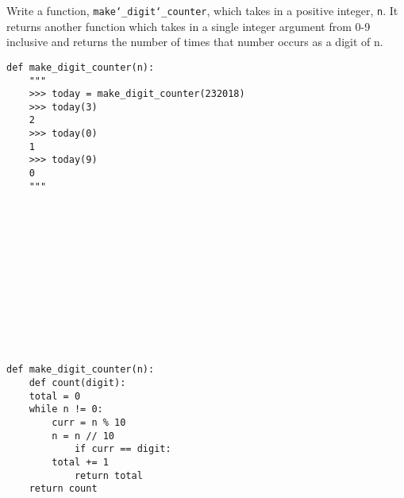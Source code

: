 \begin{blocksection}
\question Write a function, \texttt{make\char`_digit\char`_counter}, which takes in a positive integer, \texttt{n}. It returns another function which takes in a single integer argument from 0-9 inclusive and returns the number of times that number occurs as a digit of n.


\begin{lstlisting}
def make_digit_counter(n):
    """
    >>> today = make_digit_counter(232018)
    >>> today(3)
    2
    >>> today(0)
    1
    >>> today(9)
    0
    """


	
	
	
	




	


\end{lstlisting}

\begin{solution}
\begin{lstlisting}
def make_digit_counter(n):
    def count(digit):
	total = 0
	while n != 0:
	    curr = n % 10
	    n = n // 10
            if curr == digit:
		total += 1
	        return total
	return count


\end{lstlisting}
\end{solution}
\end{blocksection}
